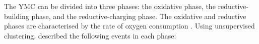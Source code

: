 
The YMC can be divided into three phases: the oxidative phase, the reductive-building phase, and the
reductive-charging phase.
The oxidative and reductive phases are characterised by the rate of oxygen consumption \citep{mellorMolecularBasisMetabolic2016}.
Using unsupervised clustering, \citet{tuLogicYeastMetabolic2005} described the following events in each phase:

